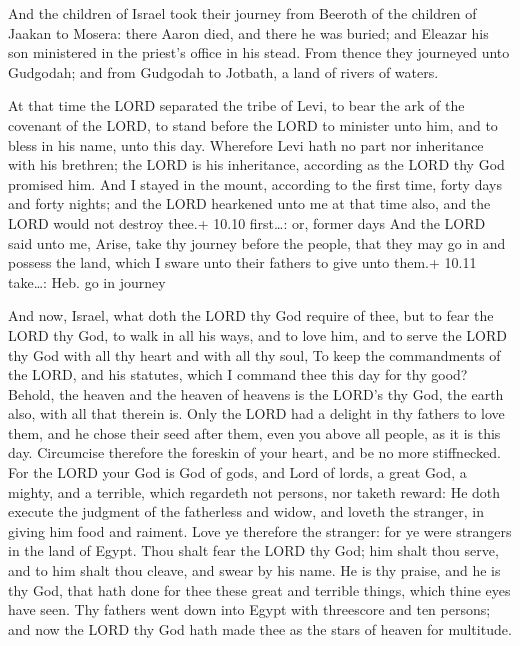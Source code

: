  And the children of Israel took their journey from
Beeroth of the children of Jaakan to Mosera: there Aaron died, and there
he was buried; and Eleazar his son ministered in the priest's office in
his stead.  From thence they journeyed unto Gudgodah; and
from Gudgodah to Jotbath, a land of rivers of waters.

 At that time the LORD separated the tribe of Levi, to
bear the ark of the covenant of the LORD, to stand before the LORD to
minister unto him, and to bless in his name, unto this day. 
Wherefore Levi hath no part nor inheritance with his brethren; the LORD
is his inheritance, according as the LORD thy God promised him.
 And I stayed in the mount, according to the first time,
forty days and forty nights; and the LORD hearkened unto me at that time
also, and the LORD would not destroy thee.+ 10.10 first\ldots: or,
former days  And the LORD said unto me, Arise, take thy
journey before the people, that they may go in and possess the land,
which I sware unto their fathers to give unto them.+ 10.11 take\ldots:
Heb. go in journey

 And now, Israel, what doth the LORD thy God require of
thee, but to fear the LORD thy God, to walk in all his ways, and to love
him, and to serve the LORD thy God with all thy heart and with all thy
soul,  To keep the commandments of the LORD, and his
statutes, which I command thee this day for thy good? 
Behold, the heaven and the heaven of heavens is the LORD's thy God, the
earth also, with all that therein is.  Only the LORD had a
delight in thy fathers to love them, and he chose their seed after them,
even you above all people, as it is this day.  Circumcise
therefore the foreskin of your heart, and be no more stiffnecked.
 For the LORD your God is God of gods, and Lord of lords, a
great God, a mighty, and a terrible, which regardeth not persons, nor
taketh reward:  He doth execute the judgment of the
fatherless and widow, and loveth the stranger, in giving him food and
raiment.  Love ye therefore the stranger: for ye were
strangers in the land of Egypt.  Thou shalt fear the LORD
thy God; him shalt thou serve, and to him shalt thou cleave, and swear
by his name.  He is thy praise, and he is thy God, that
hath done for thee these great and terrible things, which thine eyes
have seen.  Thy fathers went down into Egypt with
threescore and ten persons; and now the LORD thy God hath made thee as
the stars of heaven for multitude.

